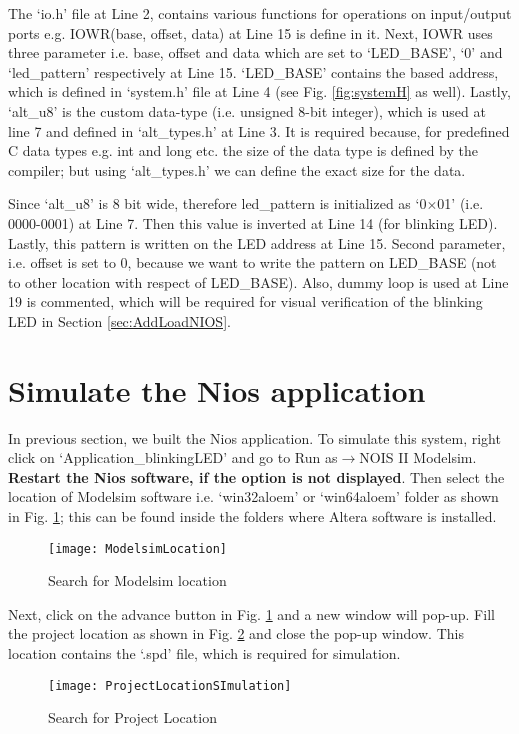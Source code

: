 \begin{explanation}
	The `io.h' file at Line 2, contains various functions for operations on input/output ports e.g. IOWR(base, offset, data) at Line 15 is define in it. Next, IOWR uses three parameter i.e. base, offset and data which are set to `LED\_BASE', `0' and `led\_pattern' respectively at Line 15. `LED\_BASE' contains the based address, which is defined in `system.h' file at Line 4 (see Fig. \ref{fig:systemH} as well). Lastly, `alt\_u8' is the custom data-type (i.e. unsigned 8-bit integer), which is used at line 7 and defined in `alt\_types.h' at Line 3. It is required because, for predefined C data types e.g. int and long etc. the size of the data type is defined by the compiler; but using `alt\_types.h' we can define the exact size for the data.  
	
	Since `alt\_u8' is 8 bit wide, therefore led\_pattern is initialized as `0$\times$01' (i.e. 0000-0001) at Line 7. Then this value is inverted at Line 14 (for blinking LED). Lastly, this pattern is written on the LED address at Line 15. Second parameter, i.e. offset is set to 0, because we want to write the pattern on LED\_BASE (not to other location with respect of LED\_BASE). Also, dummy loop is used at Line 19 is commented, which will be required for visual verification of the blinking LED in Section \ref{sec:AddLoadNIOS}.
\end{explanation}


\section{Simulate the Nios application}\label{sec:SimulateNios}
In previous section, we built the Nios application. To simulate this system, right click on `Application\_blinkingLED' and go to Run as$\rightarrow$NOIS II Modelsim. \textbf{Restart the Nios software, if the option is not displayed}. Then select the location of Modelsim software i.e. `win32aloem' or `win64aloem' folder as shown in Fig. \ref{fig:ModelsimLocation}; this can be found inside the folders where Altera software is installed. 
\begin{figure}[!h]
	\centering
	\texttt{[image: ModelsimLocation]}
	\caption{Search for Modelsim location}
	\label{fig:ModelsimLocation}
\end{figure}


Next, click on the advance button in Fig. \ref{fig:ModelsimLocation} and a new window will pop-up. Fill the project location as shown in Fig. \ref{fig:ProjectLocationSImulation} and close the pop-up window. This location contains the `.spd' file, which is required for simulation. 
\begin{figure}[!h]
	\centering
	\texttt{[image: ProjectLocationSImulation]}
	\caption{Search for Project Location}
	\label{fig:ProjectLocationSImulation}
\end{figure}


